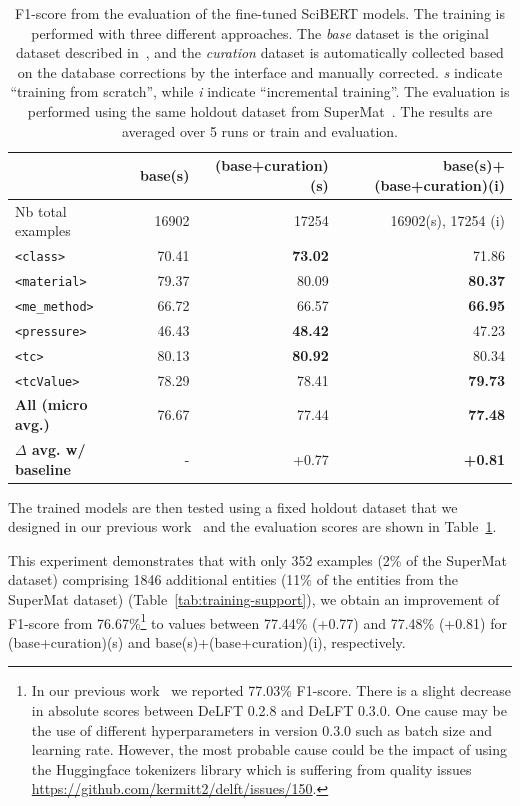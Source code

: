 \begin{table}[ht]
\centering\small
\caption{F1-score from the evaluation of the fine-tuned SciBERT models. The training is performed with three different approaches. 
The \emph{base} dataset is the original dataset described in~\cite{foppiano2021supermat}, and the \emph{curation} dataset is automatically collected based on the database corrections by the interface and manually corrected. \textit{s} indicate ``training from scratch'', while \textit{i} indicate ``incremental training''. 
The evaluation is performed using the same holdout dataset from SuperMat~\cite{foppiano2021supermat}. 
The results are averaged over 5 runs or train and evaluation. }
\begin{tabular}{lrrr}
\toprule
& \textbf{base(s)} & \textbf{(base+curation)(s)} & \textbf{base(s)+(base+curation)(i)} \\ 
\midrule
Nb total examples & 16902 & 17254 & 16902(s), 17254 (i)\\ 
\midrule
\texttt{<class>}        & 70.41         & \textbf{73.02}         & 71.86 \\ 
\texttt{<material>}     & 79.37         & 80.09         & \textbf{80.37} \\ 
\texttt{<me\_method>}   & 66.72         & 66.57         & \textbf{66.95} \\ 
\texttt{<pressure>}     & 46.43         & \textbf{48.42}         & 47.23 \\ 
\texttt{<tc>}           & 80.13         & \textbf{80.92}         & 80.34 \\ 
\texttt{<tcValue>}      & 78.29         & 78.41         & \textbf{79.73} \\ 
\midrule
\textbf{All (micro avg.)} & 76.67       & 77.44         & \textbf{77.48} \\ 
\midrule
\textbf{$\Delta$ avg. w/ baseline}& -   & +0.77     & \textbf{+0.81} \\ 
\bottomrule
\end{tabular}
\label{tab:evaluation-curation-training2}
\end{table}


The trained models are then tested using a fixed holdout dataset that we designed in our previous work~\cite{foppiano2023automatic} and the evaluation scores are shown in Table~\ref{tab:evaluation-curation-training2}.

This experiment demonstrates that with only 352 examples (2\% of the SuperMat dataset) comprising 1846 additional entities (11\% of the entities from the SuperMat dataset) (Table~\ref{tab:training-support}), we obtain an improvement of F1-score from 76.67\%\footnote{In our previous work~\cite{foppiano2023automatic} we reported 77.03\% F1-score. 
There is a slight decrease in absolute scores between DeLFT 0.2.8 and DeLFT 0.3.0. 
One cause may be the use of different hyperparameters in version 0.3.0 such as batch size and learning rate.
However, the most probable cause could be the impact of using the Huggingface tokenizers library which is suffering from quality issues \url{https://github.com/kermitt2/delft/issues/150}.} to values between 77.44\% (+0.77) and 77.48\% (+0.81) for (base+curation)(s) and base(s)+(base+curation)(i), respectively. 


